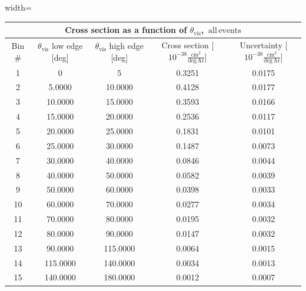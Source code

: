 \begin{table}[H]
\raggedright
\begin{adjustbox}{width=\textwidth}
\small
\begin{tabular}{ |c|c|c|c|c| }
\hline
\multicolumn{5}{|c|}{Cross section as a function of $\theta_{\mathrm{vis}}$, $\mathrm{\,all\,events}$} \\
\hline
\hline
Bin \# & $\theta_{\mathrm{vis}}$ low edge [deg] & $\theta_{\mathrm{vis}}$ high edge [deg] & Cross section [$10^{-38}\frac{\mathrm{cm}^{2}}{\mathrm{deg}\,\mathrm{Ar}}$] & Uncertainty [$10^{-38}\frac{\mathrm{cm}^{2}}{\mathrm{deg}\,\mathrm{Ar}}$] \\
\hline
\hline
1 & 0 & 5 & 0.3251 & 0.0175\\
2 & 5.0000 & 10.0000 & 0.4128 & 0.0177\\
3 & 10.0000 & 15.0000 & 0.3593 & 0.0166\\
4 & 15.0000 & 20.0000 & 0.2536 & 0.0117\\
5 & 20.0000 & 25.0000 & 0.1831 & 0.0101\\
6 & 25.0000 & 30.0000 & 0.1487 & 0.0073\\
7 & 30.0000 & 40.0000 & 0.0846 & 0.0044\\
8 & 40.0000 & 50.0000 & 0.0582 & 0.0039\\
9 & 50.0000 & 60.0000 & 0.0398 & 0.0033\\
10 & 60.0000 & 70.0000 & 0.0277 & 0.0034\\
11 & 70.0000 & 80.0000 & 0.0195 & 0.0032\\
12 & 80.0000 & 90.0000 & 0.0147 & 0.0032\\
13 & 90.0000 & 115.0000 & 0.0064 & 0.0015\\
14 & 115.0000 & 140.0000 & 0.0034 & 0.0013\\
15 & 140.0000 & 180.0000 & 0.0012 & 0.0007\\
\hline
\end{tabular}
\end{adjustbox}
\end{table}


